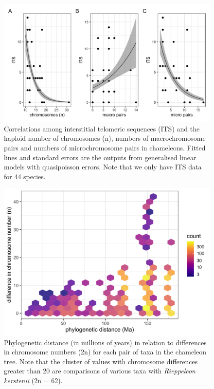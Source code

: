 \documentclass[a4paper, 12pt]{article}
\begin{document}
\newpage
\begin{figure}[h]
 \centering
  \includegraphics[width = \linewidth]{figures/ITS-chromosomes.png}
  \caption{Correlations among interstitial telomeric sequences (ITS) and the haploid number of chromosomes (n), numbers of macrochromosome pairs and numbers of microchromosome pairs in chameleons. Fitted lines and standard errors are the outputs from generalised linear models with quasipoisson errors. Note that we only have ITS data for 44 species.
}
  \label{fig-its}
\end{figure}

\newpage
\begin{figure}[h]
 \centering
  \includegraphics[width = \linewidth]{figures/species-pairs-distances.png}
  \caption{Phylogenetic distance (in millions of years) in relation to differences in chromosome numbers (2n) for each pair of taxa in the chameleon tree. Note that the cluster of values with chromosome differences greater than 20 are comparisons of various taxa with \textit{Rieppeleon kerstenii} (2n = 62).}
  \label{fig-pairwise}
\end{figure}
\end{document}
